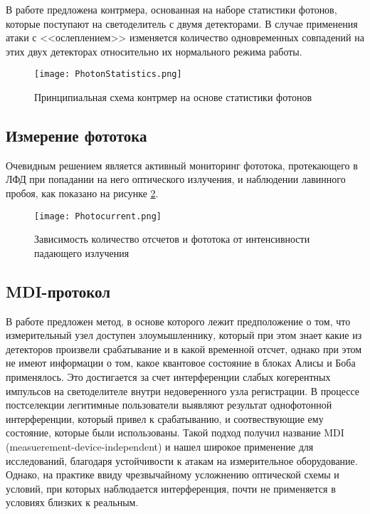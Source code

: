 В работе предложена контрмера, основанная на наборе статистики фотонов, которые поступают на светоделитель с двумя детекторами. В случае применения атаки с <<ослеплением>> изменяется количество одновременных совпадений на этих двух детекторах относительно их нормального режима работы. 

 \begin{figure}[ht]
  \centering
  \texttt{[image: PhotonStatistics.png]}
  \caption{Принципиальная схема контрмер на основе статистики фотонов}
  \label{fig:PhotonStatistics}
\end{figure}

\subsection{Измерение фототока} \label{subsec:ch1/sec7/sub2}

Очевидным решением является активный мониторинг фототока, протекающего в ЛФД при попадании на него оптического излучения, и наблюдении лавинного пробоя, как показано на рисунке \ref{fig:Photocurrent}. 

 \begin{figure}[ht]
  \centering
  \texttt{[image: Photocurrent.png]}
  \caption{Зависимость количество отсчетов и фототока от интенсивности падающего излучения}
  \label{fig:Photocurrent}
\end{figure}
\pagebreak

\subsection{MDI-протокол} \label{subsec:ch1/sec7/sub3}

В работе предложен метод, в основе которого лежит предположение о том, что измерительный узел доступен злоумышленнику, который при этом знает какие из детекторов произвели срабатывание и в какой временной отсчет, однако при этом не имеют информации о том, какое квантовое состояние в блоках Алисы и Боба применялось. Это достигается за счет интерференции слабых когерентных импульсов на светоделителе внутри недоверенного узла регистрации. В процессе постселекции легитимные пользователи выявляют результат однофотонной интерференции, который привел к срабатыванию, и соотвествующие ему состояние, которые были использованы. Такой подход получил название MDI (measuerement-device-independent) и нашел широкое применение для исследований, благодаря устойчивости к атакам на измерительное оборудование. Однако, на практике ввиду чрезвычайному усложнению оптической схемы и условий, при которых наблюдается интерференция, почти не применяется в условиях близких к реальным. 


